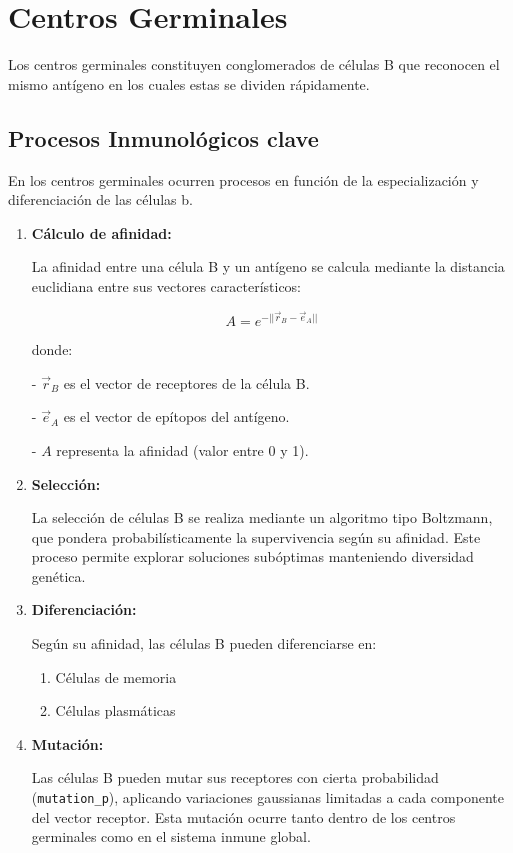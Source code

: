 \section{Centros Germinales}

Los centros germinales constituyen conglomerados de células B que reconocen el mismo antígeno en los cuales estas se dividen rápidamente.
\subsection{Procesos Inmunológicos clave}
En los centros germinales ocurren procesos en función de la especialización y diferenciación de las células b.
\begin{enumerate}
    \item \textbf{Cálculo de afinidad:}
     
    La afinidad entre una célula B y un antígeno se calcula mediante la distancia euclidiana entre sus vectores característicos:

    $$
    A = e^{-||\vec{r}_{B} - \vec{e}_{A}||}
    $$
    
    donde:
    
        
    - $\vec{r}_B$ es el vector de receptores de la célula B.
        
    - $\vec{e}_A$ es el vector de epítopos del antígeno.
        
    - $A$ representa la afinidad (valor entre 0 y 1).
    \item \textbf{Selección:}
    
    La selección de células B se realiza mediante un algoritmo tipo Boltzmann, que pondera probabilísticamente la supervivencia según su afinidad. Este proceso permite explorar soluciones subóptimas manteniendo diversidad genética.
    \item \textbf{Diferenciación:}
    
    Según su afinidad, las células B pueden diferenciarse en:
        \begin{enumerate}
            \item Células de memoria 
            \item Células plasmáticas 
        \end{enumerate}
    \item \textbf{Mutación:}
    
    Las células B pueden mutar sus receptores con cierta probabilidad (\texttt{mutation\_p}), aplicando variaciones gaussianas limitadas a cada componente del vector receptor. Esta mutación ocurre tanto dentro de los centros germinales como en el sistema inmune global.
\end{enumerate}

